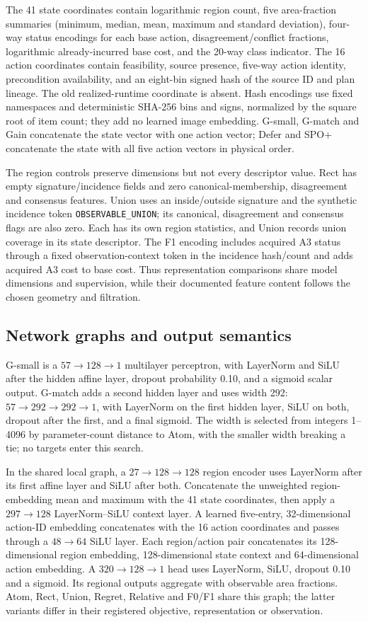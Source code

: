 The 41 state coordinates contain logarithmic region count, five area-fraction
summaries (minimum, median, mean, maximum and standard deviation), four-way
status encodings for each base action, disagreement/conflict fractions,
logarithmic already-incurred base cost, and the 20-way class indicator.
The 16 action coordinates contain feasibility, source presence, five-way
action identity, precondition availability, and an eight-bin signed hash of
the source ID and plan lineage. The old realized-runtime coordinate is
absent. Hash encodings use fixed namespaces and deterministic SHA-256 bins
and signs, normalized by the square root of item count; they add no learned
image embedding. G-small, G-match and Gain concatenate the state vector
with one action vector; Defer and SPO+ concatenate the state with all five
action vectors in physical order.

The region controls preserve dimensions but not every descriptor value.
Rect has empty signature/incidence fields and zero canonical-membership,
disagreement and consensus features. Union uses an inside/outside signature
and the synthetic incidence token \texttt{OBSERVABLE\_UNION}; its canonical,
disagreement and consensus flags are also zero. Each has its own region
statistics, and Union records union coverage in its state descriptor. The
F1 encoding includes acquired A3 status through a fixed observation-context
token in the incidence hash/count and adds acquired A3 cost to base cost.
Thus representation comparisons share model dimensions and supervision,
while their documented feature content follows the chosen geometry and
filtration.

\subsection{Network graphs and output semantics}
G-small is a $57\!\to\!128\!\to\!1$ multilayer perceptron, with LayerNorm
and SiLU after the hidden affine layer, dropout probability 0.10, and a
sigmoid scalar output. G-match adds a second hidden layer and uses width
292: $57\!\to\!292\!\to\!292\!\to\!1$, with LayerNorm on the first
hidden layer, SiLU on both, dropout after the first, and a final sigmoid.
The width is selected from integers 1--4096 by parameter-count distance to
Atom, with the smaller width breaking a tie; no targets enter this search.

In the shared local graph, a $27\!\to\!128\!\to\!128$ region encoder
uses LayerNorm after its first affine layer and SiLU after both. Concatenate
the unweighted region-embedding mean and maximum with the 41 state
coordinates, then apply a $297\!\to\!128$ LayerNorm--SiLU context layer.
A learned five-entry, 32-dimensional action-ID embedding concatenates with
the 16 action coordinates and passes through a $48\!\to\!64$ SiLU layer.
Each region/action pair concatenates its 128-dimensional region embedding,
128-dimensional state context and 64-dimensional action embedding. A
$320\!\to\!128\!\to\!1$ head uses LayerNorm, SiLU, dropout 0.10 and a
sigmoid. Its regional outputs aggregate with observable area fractions.
Atom, Rect, Union, Regret, Relative and F0/F1 share this graph; the latter
variants differ in their registered objective, representation or observation.

